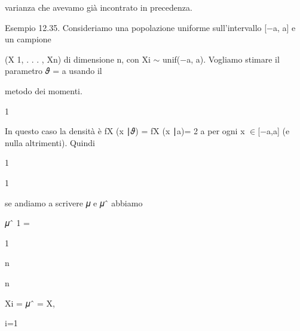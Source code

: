 \documentclass[a4paper,portrait,12pt]{article}
\begin{document}
\begin{flushleft}
varianza che avevamo gi\`{a} incontrato in precedenza.
\end{flushleft}


\begin{flushleft}
Esempio 12.35. Consideriamo una popolazione uniforme sull'intervallo [$-$a, a] e un campione
\end{flushleft}


\begin{flushleft}
(X 1, . . . , Xn) di dimensione n, con Xi $\sim$ unif($-$a, a). Vogliamo stimare il parametro 𝜗 = a usando il
\end{flushleft}


\begin{flushleft}
metodo dei momenti.
\end{flushleft}


1


\begin{flushleft}
In questo caso la densit\`{a} \`{e} fX (x ∣𝜗) = fX (x ∣a)= 2 a per ogni x $\in$[$-$a,a] (e nulla altrimenti). Quindi
\end{flushleft}


1


1


\begin{flushleft}
se andiamo a scrivere 𝜇 e 𝜇ˆ abbiamo
\end{flushleft}


\begin{flushleft}
𝜇ˆ 1 =
\end{flushleft}





1


\begin{flushleft}
n
\end{flushleft}





\begin{flushleft}
n
\end{flushleft}





\begin{flushleft}
Xi = 𝜇ˆ = X,
\end{flushleft}





\begin{flushleft}
i=1
\end{flushleft}
\end{document}
